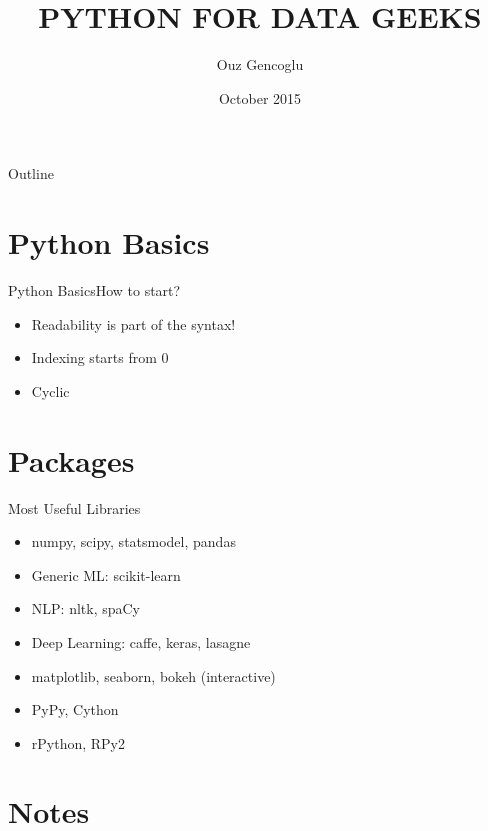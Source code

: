 \documentclass{beamer}
\title{PYTHON FOR DATA GEEKS}
\author{Ouz Gencoglu}
\institute[TUT] %
{

  Tampere University of Technology, Finland

}
\date{October 2015}
\begin{document}
\begin{frame}
	\titlepage
\end{frame}

\begin{frame}{Outline}
	\tableofcontents
\end{frame}

\section{Python Basics}

\begin{frame}{Python Basics}{How to start?}

	\begin{itemize}
		\item {Readability is part of the syntax!} \pause
		\item {Indexing starts from 0}\pause
		\item {Cyclic}

	\end{itemize}
	
\end{frame}

\section{Packages}

\begin{frame}{Most Useful Libraries}

	\begin{itemize}
		\item {numpy, scipy, statsmodel, pandas} \pause
		\item {Generic ML: scikit-learn}\pause
		\item {NLP: nltk, spaCy}\pause
		\item {Deep Learning: caffe, keras, lasagne}\pause
		\item {matplotlib, seaborn, bokeh (interactive) }\pause
		\item {PyPy, Cython	}\pause
		\item {rPython, RPy2}
	\end{itemize}
	
\end{frame}

\section{Notes}
\end{document}
